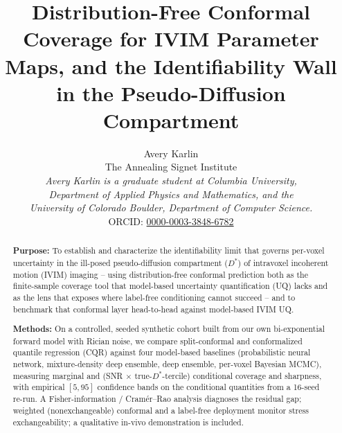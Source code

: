 \documentclass[11pt]{article}
\title{\textbf{Distribution-Free Conformal Coverage for IVIM Parameter
Maps, and the Identifiability Wall in the Pseudo-Diffusion Compartment}}
\author{Avery Karlin\\[2pt]
\small The Annealing Signet Institute\\[3pt]
\small \textit{Avery Karlin is a graduate student at Columbia University,}\\[1pt]
\small \textit{Department of Applied Physics and Mathematics, and the}\\[1pt]
\small \textit{University of Colorado Boulder, Department of Computer Science.}\\[3pt]
\small ORCID: \href{https://orcid.org/0000-0003-3848-6782}{0000-0003-3848-6782}}
\date{}
\newcommand{\Dstar}{D^{*}}
\begin{document}
\maketitle

\begin{abstract}
\noindent
\textbf{Purpose:} To establish and characterize the identifiability
limit that governs per-voxel uncertainty in the ill-posed pseudo-diffusion
compartment ($\Dstar$) of intravoxel incoherent motion (IVIM) imaging -- using
distribution-free conformal prediction both as the finite-sample coverage tool
that model-based uncertainty quantification (UQ) lacks and as the lens that
exposes where label-free conditioning cannot succeed -- and to benchmark that
conformal layer head-to-head against model-based IVIM UQ.

\noindent
\textbf{Methods:} On a controlled, seeded synthetic cohort built from our own
bi-exponential forward model with Rician noise, we compare split-conformal and
conformalized quantile regression (CQR) against four model-based baselines
(probabilistic neural network, mixture-density deep ensemble, deep ensemble,
per-voxel Bayesian MCMC), measuring marginal and (SNR $\times$
true-$\Dstar$-tercile) conditional coverage and sharpness, with empirical
$[5,95]$ confidence bands on the conditional quantities from a 16-seed re-run. A
Fisher-information / Cram\'er--Rao analysis diagnoses the residual gap; weighted
(nonexchangeable) conformal and a label-free deployment monitor stress
exchangeability; a qualitative in-vivo demonstration is included.


\end{abstract}
\end{document}
